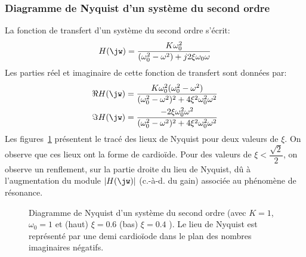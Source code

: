 \subsubsection{Diagramme de Nyquist d'un système du second ordre}
La fonction de transfert d'un système du second ordre s'écrit:
\[
H(\jw)=\dfrac{K\omega_0^2}{(\omega_0^2-\omega^2)+j2\xi\omega_0\omega}
\]
Les parties réel et imaginaire de cette fonction de transfert sont données par:
\begin{align*}
    \Re{H(\jw)}&=
    \dfrac{K\omega_0^2(\omega_0^2-\omega^2)}{(\omega_0^2-\omega^2)^2
    +4\xi^2\omega_0^2\omega^2}\\
    \Im{H(\jw)}&=\dfrac{-2\xi\omega_0^2\omega^2}{(\omega_0^2-\omega^2)^2
    +4\xi^2\omega_0^2\omega^2}
\end{align*}
Les figures~\cref{fig-nyquist_2nd_1} présentent le tracé des lieux de Nyquist 
pour deux valeurs de $\xi$. On observe que ces lieux ont la forme de cardioïde.
Pour des valeurs de $\xi<\dfrac{\sqrt{2}}{2}$, on observe un renflement, sur 
la partie droite du lieu de Nyquist, dû à l'augmentation
du module $|H(\jw)|$ (c.-à-d. du gain) associée au phénomène de résonance.
\begin{figure}[!h]
    \centering
    

    
    \caption{Diagramme de Nyquist d'un système du second ordre 
             (avec $K=1$,$\omega_0=1$ et (haut) $\xi=0.6$ (bas) $\xi=0.4$ ). 
             Le lieu de Nyquist est représenté par 
             une demi cardio\"iode dans le plan des nombres imaginaires 
             négatifs.\label{fig-nyquist_2nd_1}}
\end{figure}
\newpage

